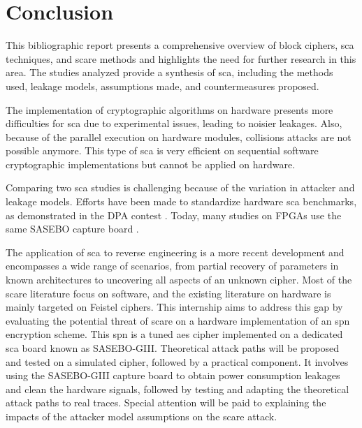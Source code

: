 \documentclass[11pt]{sdm}
\begin{document}


\section{Conclusion}

This bibliographic report presents a comprehensive overview of block ciphers, \gls{sca} techniques, and \gls{scare} methods and highlights the need for further research in this area.
The studies analyzed provide a synthesis of \gls{sca}, including the methods used, leakage models, assumptions made, and countermeasures proposed.

The implementation of cryptographic algorithms on hardware presents more difficulties for \gls{sca} due to experimental issues, leading to noisier leakages.
Also, because of the parallel execution on hardware modules, collisions attacks are not possible anymore.
This type of \gls{sca} is very efficient on sequential software cryptographic implementations but cannot be applied on hardware.

Comparing two \gls{sca} studies is challenging because of the variation in attacker and leakage models.  
Efforts have been made to standardize hardware \gls{sca} benchmarks, as demonstrated in the DPA contest \parencite{Clavier_Danger_Duc_Elaabid_Gérard_Guilley_Heuser_Kasper_Li_Lomné_et_al_2014}.
Today, many studies on FPGAs use the same SASEBO capture board \parencite{Satoh}.

The application of \gls{sca} to reverse engineering is a more recent development and encompasses a wide range of scenarios, from partial recovery of parameters in known architectures to uncovering all aspects of an unknown cipher.
Most of the \gls{scare} literature focus on software, and the existing literature on hardware is mainly targeted on Feistel ciphers.
This internship aims to address this gap by evaluating the potential threat of \gls{scare} on a hardware implementation of an \gls{spn} encryption scheme.
This \gls{spn} is a tuned \gls{aes} cipher implemented on a dedicated \gls{sca} board known as SASEBO-GIII.
Theoretical attack paths will be proposed and tested on a simulated cipher, followed by a practical component.
It involves using the SASEBO-GIII capture board to obtain power consumption leakages and clean the hardware signals, followed by testing and adapting the theoretical attack paths to real traces.
Special attention will be paid to explaining the impacts of the attacker model assumptions on the \gls{scare} attack.





\printbibliography[title=Bibliographie]
\end{document}
